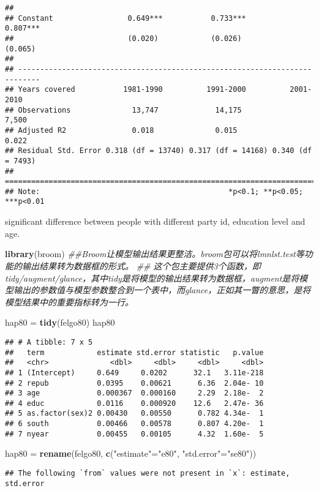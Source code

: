 \documentclass[]{article}
\newenvironment{Shaded}{\begin{snugshade}}{\end{snugshade}}
\newcommand{\CommentTok}[1]{\textcolor[rgb]{0.56,0.35,0.01}{\textit{#1}}}
\newcommand{\KeywordTok}[1]{\textcolor[rgb]{0.13,0.29,0.53}{\textbf{#1}}}
\newcommand{\NormalTok}[1]{#1}
\newcommand{\StringTok}[1]{\textcolor[rgb]{0.31,0.60,0.02}{#1}}
\begin{document}
\begin{verbatim}
##                                                                            
## Constant                 0.649***           0.733***          0.807***     
##                          (0.020)            (0.026)            (0.065)     
##                                                                            
## ---------------------------------------------------------------------------
## Years covered           1981-1990          1991-2000          2001-2010    
## Observations              13,747             14,175             7,500      
## Adjusted R2               0.018              0.015              0.022      
## Residual Std. Error 0.318 (df = 13740) 0.317 (df = 14168) 0.340 (df = 7493)
## ===========================================================================
## Note:                                           *p<0.1; **p<0.05; ***p<0.01
\end{verbatim}

significant difference between people with different party id, education
level and age.

\begin{Shaded}
\begin{Highlighting}[]
\KeywordTok{library}\NormalTok{(broom) }\CommentTok{##Broom让模型输出结果更整洁。broom包可以将lmnlst.test等功能的输出结果转为数据框的形式。}
\CommentTok{## 这个包主要提供3个函数，即tidy/augment/glance，其中tidy是将模型的输出结果转为数据框，augment是将模型输出的参数值与模型参数整合到一个表中，而glance，正如其一瞥的意思，是将模型结果中的重要指标转为一行。}

\NormalTok{hap80 =}\StringTok{ }\KeywordTok{tidy}\NormalTok{(felgo80)}
\NormalTok{hap80}
\end{Highlighting}
\end{Shaded}

\begin{verbatim}
## # A tibble: 7 x 5
##   term            estimate std.error statistic   p.value
##   <chr>              <dbl>     <dbl>     <dbl>     <dbl>
## 1 (Intercept)     0.649     0.0202      32.1   3.11e-218
## 2 repub           0.0395    0.00621      6.36  2.04e- 10
## 3 age             0.000367  0.000160     2.29  2.18e-  2
## 4 educ            0.0116    0.000920    12.6   2.47e- 36
## 5 as.factor(sex)2 0.00430   0.00550      0.782 4.34e-  1
## 6 south           0.00466   0.00578      0.807 4.20e-  1
## 7 nyear           0.00455   0.00105      4.32  1.60e-  5
\end{verbatim}

\begin{Shaded}
\begin{Highlighting}[]
\NormalTok{hap80 =}\StringTok{ }\KeywordTok{rename}\NormalTok{(felgo80, }\KeywordTok{c}\NormalTok{(}\StringTok{"estimate"}\NormalTok{=}\StringTok{"e80"}\NormalTok{, }\StringTok{"std.error"}\NormalTok{=}\StringTok{"se80"}\NormalTok{))}
\end{Highlighting}
\end{Shaded}

\begin{verbatim}
## The following `from` values were not present in `x`: estimate, std.error
\end{verbatim}
\end{document}
